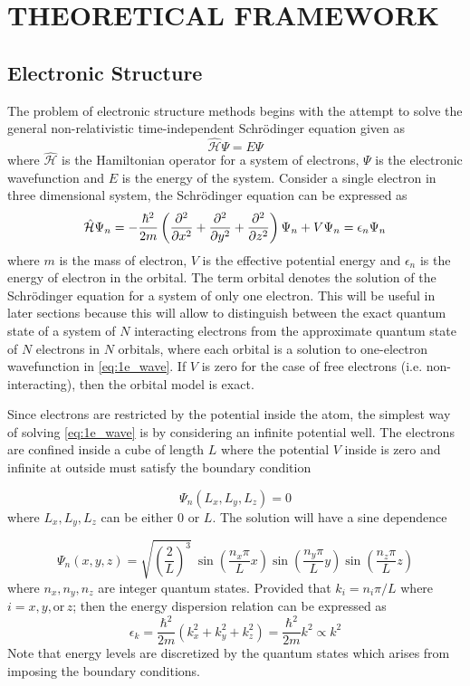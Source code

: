 \chapter{THEORETICAL FRAMEWORK}
\section{Electronic Structure}
The problem of electronic structure methods begins with the attempt to solve the general non-relativistic time-independent Schr\"{o}dinger equation given as \citep{Schroedinger1926}
\begin{equation} \label{eq:schrodinger}
	\hat{\mathcal{H}} \Psi = E \Psi
\end{equation}
where $\hat{\mathcal{H}}$ is the Hamiltonian operator for a system of electrons, $\Psi$ is the electronic wavefunction and $E$ is the energy of the system. Consider a single electron in three dimensional system, the Schr\"{o}dinger equation can be expressed as
\begin{equation} \label{eq:1e_wave}
	\hat{\mathcal{H}} \Psi_n = - \frac{\hbar^2}{2m} \left(\pdv[2]{x} + \pdv[2]{y} + \pdv[2]{z} \right) \Psi_n + V \Psi_n  = \epsilon_n \Psi_n
\end{equation}
where $m$ is the mass of electron, $V$ is the effective potential energy and $\epsilon_n$ is the energy of electron in the orbital. The term orbital denotes the solution of the Schr\"{o}dinger equation for a system of only one electron. This will be useful in later sections because this will allow to distinguish between the exact quantum state of a system of $N$ interacting  electrons
from the approximate quantum state of $N$ electrons in $N$ orbitals, where each orbital is a solution to one-electron wavefunction in \eqref{eq:1e_wave}. If $V$ is zero for the case of free electrons (i.e. non-interacting), then the orbital model is exact.

Since electrons are restricted by the potential inside the atom, the simplest way of solving \eqref{eq:1e_wave} is by considering an infinite potential well. The electrons are confined inside a cube of length $L$ where the potential $V$ inside is zero and infinite at outside must satisfy the boundary condition

\begin{equation}
	\Psi_n(L_x,L_y,L_z) = 0
\end{equation}
where $L_x,L_y,L_z$ can be either 0 or $L$. The solution will have a sine dependence

\begin{equation}
	\Psi_n(x,y,z) = \sqrt{\left(\frac{2}{L}\right)^3} \ \sin(\frac{n_x \pi }{L} x) \sin(\frac{n_y \pi}{L} y) \sin(\frac{n_z \pi}{L} z)
\end{equation}
where $n_x,n_y,n_z$ are integer quantum states. Provided that $ k_i = n_i \pi / L$ where $i=x,y, \text{or}\, z$; then the energy dispersion relation can be expressed as
\begin{equation} \label{eq:free_e}
	\epsilon_k = \frac{\hbar^2}{2m} (k_x^2 + k_y^2 + k_z^2) = \frac{\hbar^2}{2m} k^2 \propto k^2
\end{equation}
Note that energy levels are discretized by the quantum states which arises from imposing the boundary conditions.
